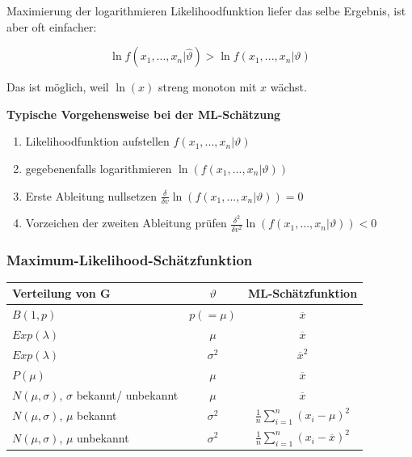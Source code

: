 \documentclass[a4paper]{article}
\begin{document}
Maximierung der logarithmieren Likelihoodfunktion liefer das selbe Ergebnis, ist aber oft einfacher:

\[
\ln f(x_1, ..., x_n | \hat{\vartheta}) > \ln f(x_1, ..., x_n | \vartheta) 
\]

Das ist möglich, weil $\ln (x)$ streng monoton mit $x$ wächst.

\textbf{Typische Vorgehensweise bei der ML-Schätzung}

\begin{enumerate}
    \item Likelihoodfunktion aufstellen $f(x_1, ..., x_n | \vartheta)$
    \item gegebenenfalls logarithmieren $\ln(f(x_1, ..., x_n | \vartheta))$
    \item Erste Ableitung nullsetzen $\frac{\delta}{\delta v} \ln(f(x_1, ..., x_n | \vartheta)) = 0$
    \item Vorzeichen der zweiten Ableitung prüfen $\frac{\delta^2}{\delta v^2} \ln(f(x_1, ..., x_n | \vartheta)) < 0$
\end{enumerate}


\subsubsection{Maximum-Likelihood-Schätzfunktion}

\begin{center}
    \begin{tabular}{lc|c}
        Verteilung von G & $\vartheta$ & ML-Schätzfunktion \\
        \hline
        $B(1, p)$ & $p(=\mu)$ & $\overline{x}$ \\
        $Exp(\lambda)$ & $\mu$ & $\overline{x}$ \\
        $Exp(\lambda)$ & $\sigma^2$ & $\overline{x}^2$ \\
        $P(\mu)$ & $\mu$ & $\overline{x}$ \\
        $N(\mu, \sigma)$, $\sigma$ bekannt/ unbekannt & $\mu$ & $\overline{x}$ \\
        $N(\mu, \sigma)$, $\mu$ bekannt & $\sigma^2$ & $\frac{1}{n}\sum_{i=1}^{n}(x_i - \mu)^2$ \\
        $N(\mu, \sigma)$, $\mu$ unbekannt & $\sigma^2$ & $\frac{1}{n}\sum_{i=1}^{n}(x_i - \overline{x})^2$ \\
    \end{tabular}
\end{center}
\end{document}
